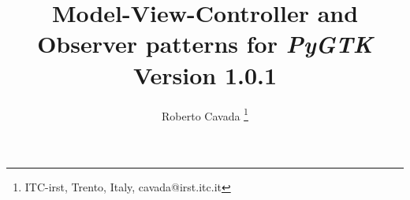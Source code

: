\documentclass{article}
\newcommand{\appl}[1]{\textsl{#1}\xspace}
\newcommand{\pygtk}{\appl{PyGTK}}
\begin{document}
\title{Model-View-Controller and Observer patterns for \pygtk \\
Version 1.0.1}

\author{ Roberto Cavada \thanks{ITC-irst, Trento, Italy,
 cavada@irst.itc.it} }

\maketitle













\end{document}
